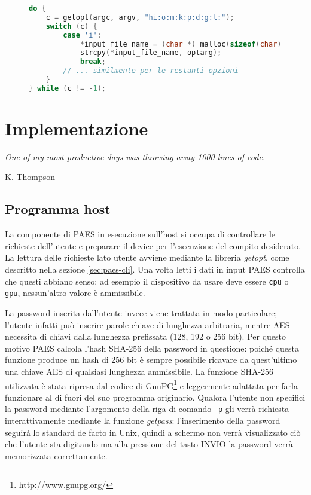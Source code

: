 \documentclass[12pt,a4paper,oneside]{book}
\begin{document}
\vspace*{10pt}
\begin{figure}
\begin{lstlisting}[caption={\textit{Lettura delle opzioni della riga di comando in PAES.}},label={cod:paes-getopt},language=C]
do {
	c = getopt(argc, argv, "hi:o:m:k:p:d:g:l:");	
	switch (c) {
		case 'i':
			*input_file_name = (char *) malloc(sizeof(char) * strlen(optarg) + 1);
			strcpy(*input_file_name, optarg);
			break;
		// ... similmente per le restanti opzioni
	}
} while (c != -1);
\end{lstlisting}
\end{figure}

\chapter{Implementazione}
\linespread{1}
\epigraph{\textit{One of my most productive days was throwing away 1000 lines of code.}}{K. Thompson}
\linespread{1.3}

\section{Programma host}

La componente di PAES in esecuzione sull'host si occupa di controllare le richieste dell'utente e preparare il device per l'esecuzione del compito desiderato. La lettura delle richieste lato utente avviene mediante la libreria \textit{getopt}, come descritto nella sezione \ref{sec:paes-cli}. Una volta letti i dati in input PAES controlla che questi abbiano senso: ad esempio il dispositivo da usare deve essere \verb|cpu| o \verb|gpu|, nessun'altro valore è ammissibile.

La password inserita dall'utente invece viene trattata in modo particolare; l'utente infatti può inserire parole chiave di lunghezza arbitraria, mentre \ac{AES} necessita di chiavi dalla lunghezza prefissata (128, 192 o 256 bit). Per questo motivo PAES calcola l'hash SHA-256 della password in questione: poiché questa funzione produce un hash di 256 bit è sempre possibile ricavare da quest'ultimo una chiave \ac{AES} di qualsiasi lunghezza ammissibile. La funzione SHA-256 utilizzata è stata ripresa dal codice di \ac{GnuPG}\footnote{http://www.gnupg.org/} e leggermente adattata per farla funzionare al di fuori del suo programma originario. Qualora l'utente non specifici la password mediante l'argomento della riga di comando \verb|-p| gli verrà richiesta interattivamente mediante la funzione \textit{getpass}: l'inserimento della password seguirà lo standard de facto in Unix, quindi a schermo non verrà visualizzato ciò che l'utente sta digitando ma alla pressione del tasto INVIO la password verrà memorizzata correttamente.
\end{document}
